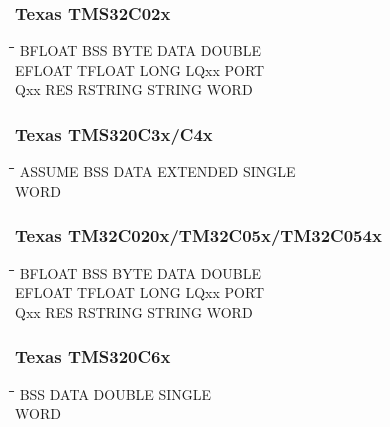\subsubsection{Texas TMS32C02x}
{\tt\begin{tabbing}
\hspace{3cm}\=\hspace{3cm}\=\hspace{3cm}\=\hspace{3cm}\=\kill
BFLOAT     \> BSS         \> BYTE        \> DATA        \> DOUBLE \\ 
EFLOAT     \> TFLOAT      \> LONG        \> LQxx        \> PORT \\
Qxx        \> RES         \> RSTRING     \> STRING      \> WORD \\
\end{tabbing}}

\subsubsection{Texas TMS320C3x/C4x}
{\tt\begin{tabbing}
\hspace{3cm}\=\hspace{3cm}\=\hspace{3cm}\=\hspace{3cm}\=\kill
ASSUME     \> BSS         \> DATA        \> EXTENDED    \> SINGLE \\
WORD \\
\end{tabbing}}

\subsubsection{Texas TM32C020x/TM32C05x/TM32C054x}
{\tt\begin{tabbing}
\hspace{3cm}\=\hspace{3cm}\=\hspace{3cm}\=\hspace{3cm}\=\kill
BFLOAT     \> BSS         \> BYTE        \> DATA        \> DOUBLE \\
EFLOAT     \> TFLOAT      \> LONG        \> LQxx        \> PORT \\
Qxx        \> RES         \> RSTRING     \> STRING      \> WORD \\
\end{tabbing}}

\subsubsection{Texas TMS320C6x}
{\tt\begin{tabbing}
\hspace{3cm}\=\hspace{3cm}\=\hspace{3cm}\=\hspace{3cm}\=\kill
BSS         \> DATA        \> DOUBLE     \> SINGLE \\
WORD \\
\end{tabbing}}


